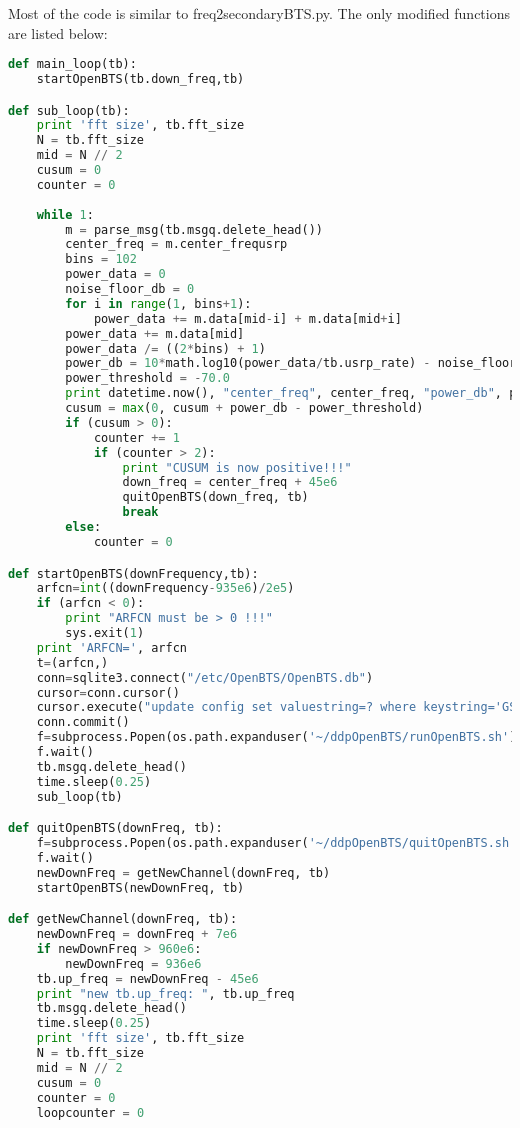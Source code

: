 Most of the code is similar to \textsf{freq2secondaryBTS.py}. The only modified 
functions are listed below:

\begin{lstlisting}[language=Python]
def main_loop(tb):
    startOpenBTS(tb.down_freq,tb)

def sub_loop(tb):
    print 'fft size', tb.fft_size
    N = tb.fft_size
    mid = N // 2
    cusum = 0
    counter = 0
    
    while 1:
        m = parse_msg(tb.msgq.delete_head())
        center_freq = m.center_frequsrp
        bins = 102
        power_data = 0
        noise_floor_db = 0
        for i in range(1, bins+1):
            power_data += m.data[mid-i] + m.data[mid+i]
        power_data += m.data[mid]
        power_data /= ((2*bins) + 1)
        power_db = 10*math.log10(power_data/tb.usrp_rate) - noise_floor_db
        power_threshold = -70.0
        print datetime.now(), "center_freq", center_freq, "power_db", power_db
        cusum = max(0, cusum + power_db - power_threshold)
        if (cusum > 0):
            counter += 1
            if (counter > 2):
                print "CUSUM is now positive!!!"
                down_freq = center_freq + 45e6
                quitOpenBTS(down_freq, tb)
                break
        else:
            counter = 0

def startOpenBTS(downFrequency,tb):
    arfcn=int((downFrequency-935e6)/2e5)
    if (arfcn < 0):
        print "ARFCN must be > 0 !!!"
        sys.exit(1)
    print 'ARFCN=', arfcn
    t=(arfcn,)
    conn=sqlite3.connect("/etc/OpenBTS/OpenBTS.db")
    cursor=conn.cursor()
    cursor.execute("update config set valuestring=? where keystring='GSM.Radio.C0'",t)
    conn.commit()
    f=subprocess.Popen(os.path.expanduser('~/ddpOpenBTS/runOpenBTS.sh'))
    f.wait()
    tb.msgq.delete_head()
    time.sleep(0.25)
    sub_loop(tb)

def quitOpenBTS(downFreq, tb):
    f=subprocess.Popen(os.path.expanduser('~/ddpOpenBTS/quitOpenBTS.sh'))
    f.wait()    
    newDownFreq = getNewChannel(downFreq, tb)
    startOpenBTS(newDownFreq, tb)

def getNewChannel(downFreq, tb):
    newDownFreq = downFreq + 7e6
    if newDownFreq > 960e6:
        newDownFreq = 936e6
    tb.up_freq = newDownFreq - 45e6
    print "new tb.up_freq: ", tb.up_freq
    tb.msgq.delete_head()
    time.sleep(0.25)
    print 'fft size', tb.fft_size
    N = tb.fft_size
    mid = N // 2
    cusum = 0
    counter = 0
    loopcounter = 0


\end{lstlisting}
